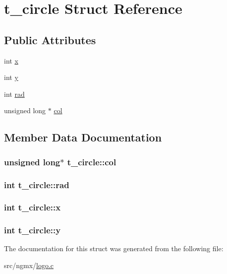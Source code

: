\hypertarget{structt__circle}{\section{t\-\_\-circle \-Struct \-Reference}
\label{structt__circle}
}
\subsection*{\-Public \-Attributes}
\begin{DoxyCompactItemize}
\item 
int \hyperlink{structt__circle_a273f31efe89a43df8148c38a22d8e2e6}{x}
\item 
int \hyperlink{structt__circle_a1deab7af5e78e074083b2fc553a78062}{y}
\item 
int \hyperlink{structt__circle_af93137d9729cdea83a47ce47695a99af}{rad}
\item 
unsigned long $\ast$ \hyperlink{structt__circle_a0ffee09f2c1ac1c6a8717b5c82d64aaa}{col}
\end{DoxyCompactItemize}


\subsection{\-Member \-Data \-Documentation}
\hypertarget{structt__circle_a0ffee09f2c1ac1c6a8717b5c82d64aaa}{
\subsubsection[{col}]{\setlength{\rightskip}{0pt plus 5cm}unsigned long$\ast$ {\bf t\-\_\-circle\-::col}}}\label{structt__circle_a0ffee09f2c1ac1c6a8717b5c82d64aaa}
\hypertarget{structt__circle_af93137d9729cdea83a47ce47695a99af}{
\subsubsection[{rad}]{\setlength{\rightskip}{0pt plus 5cm}int {\bf t\-\_\-circle\-::rad}}}\label{structt__circle_af93137d9729cdea83a47ce47695a99af}
\hypertarget{structt__circle_a273f31efe89a43df8148c38a22d8e2e6}{
\subsubsection[{x}]{\setlength{\rightskip}{0pt plus 5cm}int {\bf t\-\_\-circle\-::x}}}\label{structt__circle_a273f31efe89a43df8148c38a22d8e2e6}
\hypertarget{structt__circle_a1deab7af5e78e074083b2fc553a78062}{
\subsubsection[{y}]{\setlength{\rightskip}{0pt plus 5cm}int {\bf t\-\_\-circle\-::y}}}\label{structt__circle_a1deab7af5e78e074083b2fc553a78062}


\-The documentation for this struct was generated from the following file\-:\begin{DoxyCompactItemize}
\item 
src/ngmx/\hyperlink{logo_8c}{logo.\-c}\end{DoxyCompactItemize}
